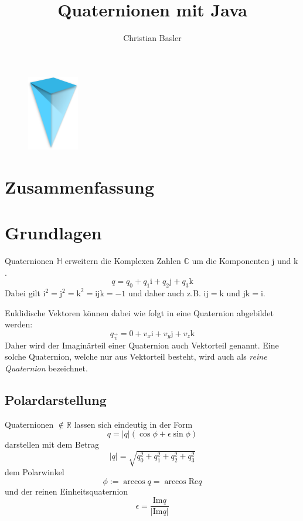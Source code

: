 \documentclass[12pt]{article}
\title{Quaternionen mit Java}
\author{Christian Basler}
\date{}
\begin{document}
  \maketitle

\begin{figure}[h]
\includegraphics[width=0.2\textwidth]{logo.png}
\centering
\end{figure}

  \tableofcontents

  \section{Zusammenfassung}



  \section{Grundlagen}

  Quaternionen $\mathbb{H}$ erweitern die Komplexen Zahlen $\mathbb{C}$ um die Komponenten $\mathrm{j}$ und $\mathrm{k}$.
  $$ q = q_0 + q_1 \mathrm{i} + q_2 \mathrm{j} + q_3 \mathrm{k} $$
  Dabei gilt $\mathrm{i}^2 = \mathrm{j}^2 = \mathrm{k}^2 = \mathrm{i}\mathrm{j}\mathrm{k} = -1$ und daher auch z.B. $\mathrm{i}\mathrm{j} = \mathrm{k}$ und $\mathrm{j}\mathrm{k} = \mathrm{i}$.

  Euklidische Vektoren können dabei wie folgt in eine Quaternion abgebildet werden:
  $$ q_{\vec{v}} = 0 + v_x \mathrm{i} + v_y \mathrm{j} + v_z \mathrm{k} $$
  Daher wird der Imaginärteil einer Quaternion auch Vektorteil genannt. Eine solche Quaternion, welche nur aus Vektorteil besteht, wird auch als \textit{reine Quaternion} bezeichnet.


  \subsection{Polardarstellung}

  Quaternionen $\notin \mathbb{R}$ lassen sich eindeutig in der Form
  $$ q = \lvert q \rvert (\cos{\phi} + \epsilon \sin{\phi}) $$
  darstellen mit dem Betrag
  $$ \lvert q \rvert = \sqrt{q_0^2 + q_1^2 + q_2^2 + q_3^2} $$
  dem Polarwinkel
  $$ \phi := \arccos{q} = \arccos{\mathrm{Re} q} $$
  und der reinen Einheitsquaternion
  $$ \epsilon = \frac{\mathrm{Im} q}{\lvert \mathrm{Im} q \rvert} $$
\end{document}
